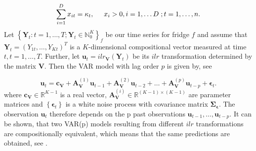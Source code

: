 \begin{equation}
\sum_{i=1}^D x_{it} = \kappa_t, \hspace{0.5cm} x_i > 0, i=1,\ldots D \hspace{0.1cm}; t=1,\ldots, n. 
\label{eq:CTS characterisation}
\end{equation} 
%
Let $\left\{\bm{Y}_t:t=1,\ldots,T; \bm{Y}_t \in \mathbb{N}_0^K \right\}_f$ be our time series for fridge $f$ and assume that $\bm{Y}_t=(Y_{1t},\ldots,Y_{Kt})^T$ is a $K$-dimensional compositional vector measured at time $t, t=1,\ldots,T$. Further, let $\textbf{u}_t = ilr_{\bm{V}}(\bm{Y}_t)$ be its $ilr$ transformation determined by the matrix $\textbf{V}$. Then the VAR model with lag order $p$ is given by, see \textcite{Kynclova:2015}

\begin{equation}
\textbf{u}_t = \textbf{c}_{\textbf{V}} + \textbf{A}_{\textbf{V}}^{(1)}\textbf{u}_{t-1} + \textbf{A}_{\textbf{V}}^{(2)}\textbf{u}_{t-2} + \ldots + \textbf{A}_{\textbf{V}}^{(p)}\textbf{u}_{t-p} + \bm{\epsilon}_{t}.
\label{eq:VAR model}
\end{equation}
%
where $\textbf{c}_{\textbf{V}} \in \mathbb{R}^{K-1}$ is a real vector, $\textbf{A}_{\textbf{V}}^{(i)} \in \mathbb{R}^{(K-1) \times (K-1)}$ are parameter matrices and $\left\{\bm{\epsilon}_t\right\}$ is a white noise process with covariance matrix $\bm{\Sigma_\epsilon}$. The observation $\textbf{u}_t$ therefore depends on the p past observations $\textbf{u}_{t-1},\ldots,\textbf{u}_{t-p}$. It can be shown, that two VAR(p) models resulting from different $ilr$ transformations are compositionally equivalent, which means that the same predictions are obtained, see \textcite{Kynclova:2015}. 



